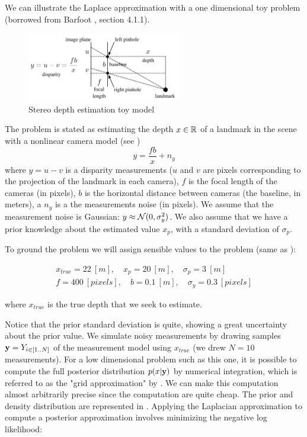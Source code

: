  We can illustrate the Laplace approximation with a one dimensional toy problem (borrowed from Barfoot \cite{barfoot2017state}, section 4.1.1).

 \begin{figure}[h]
    \centering
    \includegraphics[width=0.6\textwidth]{figures/barfoot_stereo.png}
    \caption{Stereo depth estimation toy model \cite{barfoot2017state}}
    \label{fig:barfoot_stereo}
 \end{figure}

%
The problem is stated as estimating the depth $x \in \mathbb{R}$ of a landmark in the scene with a nonlinear camera model (see )
%
\begin{equation}
    y = \frac{fb}{x} + n_y
\end{equation}
%
where $y=u - v$ is a disparity measurements ($u$ and $v$ are pixels corresponding to the projection of the landmark in each camera), $f$ is the focal
length of the cameras (in pixels), $b$ is the horizontal distance between cameras (the baseline, in meters), a $n_y$ is a the measurements noise (in pixels).
We assume that the measurement noise is Gaussian: $y \approx \mathcal{N}({0},{\sigma_y^2})$. We also assume that we have a prior knowledge about the 
estimated value $x_p$, with a standard deviation of $\sigma_p$.

To ground the problem we will assign sensible values to the problem (same as \cite{barfoot2017state}):

\begin{gather*}
    x_{true} = 22~[m], \quad x_p = 20~[m], \quad \sigma_p = 3~[m] \\
    f = 400~[pixels], \quad b = 0.1~[m], \quad \sigma_y = 0.3~[pixels]   
\end{gather*}

where $x_{true}$ is the true depth that we seek to estimate.

Notice that the prior standard deviation is quite, showing a great uncertainty about the prior value. We simulate noisy measurements by drawing samples 
${\bf y} = {Y}_{i \in [1..N]}$ of the measurement model using $x_{true}$ (we drew $N=10$ measurements). For a low dimensional problem such as this one, 
it is possible to compute the full posterior distribution $p(x|{\bf y})$ by numerical integration, which is referred to as the "grid approximation" by 
\cite{mcelreath2018statistical}. We can make this computation almost arbitrarily precise since the computation are quite cheap. The prior and density distribution are represented in . Applying the Laplacian approximation to
compute a posterior approximation involves minimizing the negative log likelihood:

